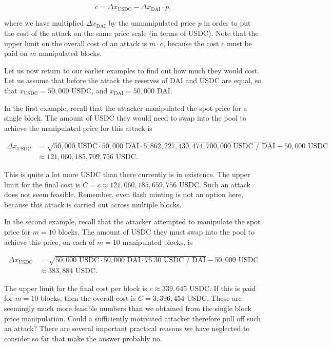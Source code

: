 \documentclass[a4paper, 11pt]{article}
\begin{document}
\begin{equation}
\label{eq:cost}
c
=
\Delta x_{\text{USDC}}
-
\Delta x_{\text{DAI}} \cdot p,
\end{equation} 

where we have multiplied $\Delta x_{\text{DAI}}$ by the unmanipulated price $p$ in order to put the cost of the attack on the same price scale (in terms of USDC). Note that the upper limit on the overall cost of an attack is $m \cdot c$, because the cost $c$ must be paid on $m$ manipulated blocks.

Let us now return to our earlier examples to find out how much they would cost. Let us assume that before the attack the reserves of DAI and USDC are equal, so that $x_{\text{USDC}} = 50,000 \text{ USDC}$, and $x_{\text{DAI}} = 50,000 \text{ DAI}$. 

In the first example, recall that the attacker manipulated the spot price for a single block. The amount of USDC they would need to swap into the pool to achieve the manipulated price for this attack is

\begin{align}
\Delta x_{\text{USDC}} 
&=
\sqrt{50,000 \text{ USDC} \cdot 50,000 \text{ DAI} \cdot 5,862,227,430,474,700,000 \text{ USDC } /\text{ DAI}} - 50,000 \text{ USDC} \\ \nonumber
&\approx
121,060,185,709,756 \text{ USDC}.
\end{align}

This is quite a lot more USDC than there currently is in existence. The upper limit for the final cost is $C = c \approx 121,060,185,659,756 \text{ USDC}$. Such an attack does not seem feasible. Remember, even flash minting is not an option here, because this attack is carried out across multiple blocks. 

In the second example, recall that the attacker attempted to manipulate the spot price for $m = 10$ blocks. The amount of USDC they must swap into the pool to achieve this price, on each of $m = 10$ manipulated blocks, is

\begin{align}
\Delta x_{\text{USDC}} 
&=
\sqrt{50,000 \text{ USDC} \cdot 50,000 \text{ DAI} \cdot 75.30 \text{ USDC } /\text{ DAI}} - 50,000 \text{ USDC} \\ \nonumber
&\approx
383,884 \text{ USDC}.
\end{align}

The upper limit for the final cost per block is $c \approx 339,645 \text{ USDC}$. If this is paid for $m = 10$ blocks, then the overall cost is $C = 3,396,454 \text{ USDC}$. These are seemingly much more feasible numbers than we obtained from the single block price manipulation. Could a sufficiently motivated attacker therefore pull off such an attack? There are several important practical reasons we have neglected to consider so far that make the answer probably no. 
\end{document}
